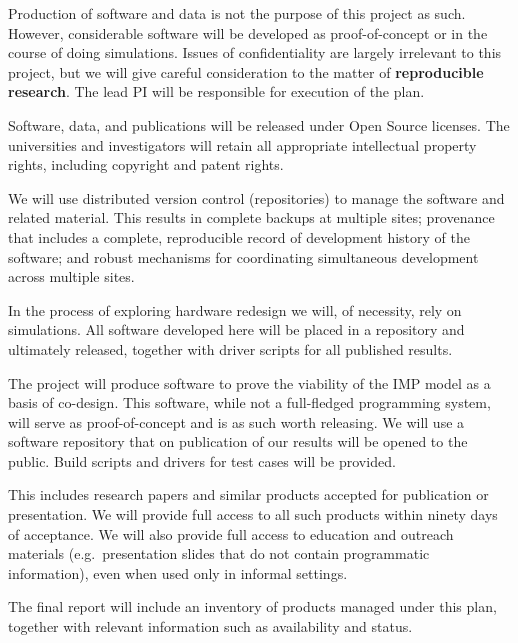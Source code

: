 Production of software and data is not the purpose of this project
as such. However, considerable software will be developed as proof-of-concept
or in the course of doing simulations.
Issues of confidentiality are largely irrelevant to this project,
but we will give careful consideration to the matter
of \textbf{reproducible research}.
The lead PI will be responsible for execution of the plan.

Software, data, and publications will be released
under Open Source licenses.
The universities and investigators will retain all appropriate
intellectual property rights, including copyright and patent rights.

 We will use distributed version control
(repositories) to manage the software and related material. This
results in complete backups at multiple sites; provenance that
includes a complete, reproducible record of development history of the
software; and robust mechanisms for coordinating simultaneous
development across multiple sites.

In the process of exploring hardware redesign
we will, of necessity, rely on simulations.
All software developed here will be placed in a repository
and ultimately released, together with driver scripts
for all published results.

The project will produce software to prove the viability
of the \ac{IMP} model as a basis of co-design. This software, while not
a full-fledged programming system, will serve as proof-of-concept
and is as such worth releasing. We will use a software repository
that on publication of our results will be opened to the public.
Build scripts and drivers for test cases will be provided.


This includes research papers and similar products accepted for
publication or presentation. We will provide full access to all such
products within ninety days of acceptance. We will also provide full
access to education and outreach materials (e.g.\ presentation slides
that do not contain programmatic information), even when used only in
informal settings.

The final report will include an
inventory of products managed under this plan, together with relevant
information such as availability and status.
